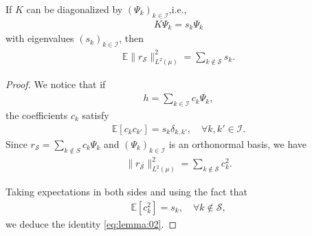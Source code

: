 \documentclass[10pt,a4paper]{amsart}
\begin{document}
\begin{lemma}
    \label{lemma:E:rS}
    If $K$ can be diagonalized by $(\Psi_k)_{k\in \mathcal{I}}$,i.e.,
    \begin{align*}
        K\Psi_k=s_k\Psi_k
    \end{align*}
    with eigenvalues $(s_k)_{k\in \mathcal{I}}$, then
    \begin{align}
        \label{eq:lemma:02} \mathbb{E}\|r_\mathcal{S}\|_{L^2(\mu)}^2 = \sum_{k\notin \mathcal{S}} s_k.
    \end{align}
\end{lemma}

\begin{proof}
    We notice that if 
    \begin{align*}
        h=\sum_{k\in \mathcal{I}} c_k \Psi_k,
    \end{align*}
    the coefficients $c_k$ satisfy
    \begin{align*}
        \mathbb{E}[c_kc_{k'}]=s_k \delta_{k,k'},\quad \forall k,k'\in \mathcal{I}.
    \end{align*}
    Since $r_{\mathcal{S}}=\sum_{k\notin S} c_k \Psi_k$ and $(\Psi_k)_{k\in \mathcal{I}}$ is an orthonormal basis, we have
    \begin{align*}
        \|r_{\mathcal{S}}\|_{L^2(\mu)}^2 = \sum_{k\notin \mathcal{S}} c_k^2.
    \end{align*}

    Taking expectations in both sides and using the fact that 
    \begin{align*}
        \mathbb{E}[c_k^2]=s_k,\quad \forall k\notin \mathcal{S},
    \end{align*}
    we deduce the identity \eqref{eq:lemma:02}.
\end{proof}
\end{document}
